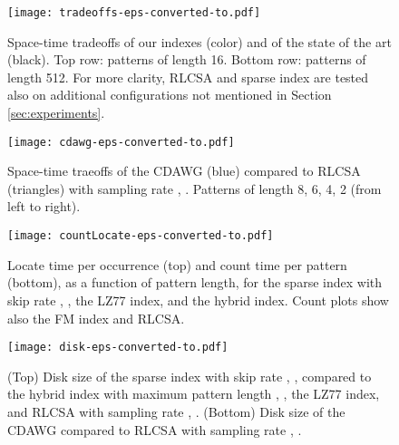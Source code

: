 \documentclass[a4paper,UKenglish]{lipics-v2016}
\begin{document}
\begin{figure}
\begin{center}
\texttt{[image: tradeoffs-eps-converted-to.pdf]}
\caption{Space-time tradeoffs of our indexes (color) and of the state of the art (black). Top row: patterns of length 16. Bottom row: patterns of length 512. For more clarity, RLCSA and sparse index are tested also on additional configurations not mentioned in Section \ref{sec:experiments}.
\label{fig:tradeoffs}
}
\end{center}
\end{figure}

\begin{figure}
\begin{center}
\texttt{[image: cdawg-eps-converted-to.pdf]}
\caption{Space-time traeoffs of the CDAWG (blue) compared to RLCSA (triangles) with sampling rate , . Patterns of length 8, 6, 4, 2 (from left to right).
\label{fig:cdawg}
}
\end{center}
\end{figure}



\begin{figure}
\begin{center}
\texttt{[image: countLocate-eps-converted-to.pdf]}
\caption{Locate time per occurrence (top) and count time per pattern (bottom), as a function of pattern length, for the sparse index with skip rate , , the LZ77 index, and the hybrid index. Count plots show also the FM index and RLCSA.
\label{fig:countLocate}
}
\end{center}
\end{figure}

\begin{figure}
\begin{center}
\texttt{[image: disk-eps-converted-to.pdf]}
\caption{(Top) Disk size of the sparse index with skip rate , , compared to the hybrid index with maximum pattern length , , the LZ77 index, and RLCSA with sampling rate , . (Bottom) Disk size of the CDAWG compared to RLCSA with sampling rate , .
\label{fig:disk}
}
\end{center}
\end{figure}
\end{document}
